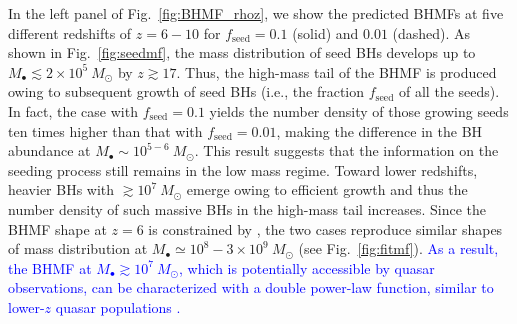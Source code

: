 \documentclass[twocolumn, twocolappendix]{aastex63}
\newcommand{\Msun}{M_\odot}
\newcommand{\fseed}{f_\mathrm{seed}}
\newcommand{\blue}[1]{\textcolor{blue}{ #1}}
\begin{document}
\begin{CJK*}{UTF8}{gbsn}
In the left panel of Fig.~\ref{fig:BHMF_rhoz}, we show the predicted BHMFs at five different redshifts of $z=6-10$
for $\fseed=0.1$ (solid) and $0.01$ (dashed).
As shown in Fig.~\ref{fig:seedmf}, the mass distribution of seed BHs develops up to $M_\bullet \lesssim 2\times10^5~\Msun$ by $z\gtrsim 17$.
Thus, the high-mass tail of the BHMF is produced owing to subsequent growth of seed BHs (i.e., the fraction $\fseed$ of all the seeds).
In fact, the case with $\fseed=0.1$ yields the number density of those growing seeds ten times higher than that with $\fseed =0.01$,
making the difference in the BH abundance at $M_\bullet \sim 10^{5-6}~\Msun$.
This result suggests that the information on the seeding process still remains in the low mass regime.
Toward lower redshifts, heavier BHs with $\gtrsim 10^7~\Msun$ emerge owing to efficient growth
and thus the number density of such massive BHs in the high-mass tail increases.
Since the BHMF shape at $z=6$ is constrained by ,
the two cases reproduce similar shapes of mass distribution at $M_\bullet \simeq 10^8-3\times 10^9~\Msun$ (see Fig.~\ref{fig:fitmf}).
\blue{As a result, the BHMF at $M_\bullet \gtrsim 10^7~\Msun$, which is potentially accessible by quasar observations,
can be characterized with a double power-law function, similar to lower-$z$ quasar populations \citep[e.g.,][]{2013ApJ...764...45K,2015MNRAS.447.2085S}.
}%
%





\end{CJK*}
\end{document}
